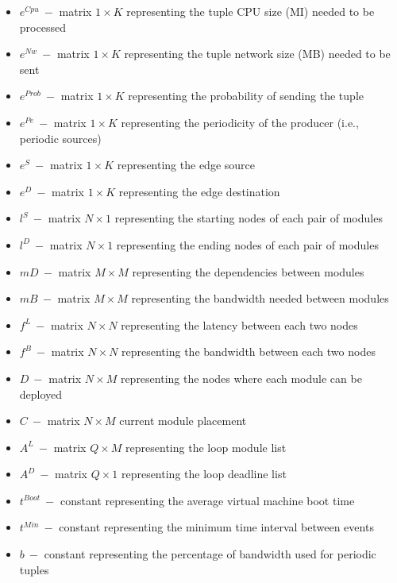 \documentclass{article}
\begin{document}
\begin{itemize}
	\item $e^{Cpu}~-$ matrix $1\times K$ representing the tuple CPU size (MI) needed to be processed
	\item $e^{Nw}~-$ matrix $1\times K$ representing the tuple network size (MB) needed to be sent
	\item $e^{Prob}~-$ matrix $1\times K$ representing the probability of sending the tuple
	\item $e^{Pe}~-$ matrix $1\times K$ representing the periodicity of the producer (i.e., periodic sources)
	\item $e^{S}~-$ matrix $1\times K$ representing the edge source
	\item $e^{D}~-$ matrix $1\times K$ representing the edge destination\\
	
	\item $l^S~-$ matrix $N\times 1$ representing the starting nodes of each pair of modules
	\item $l^D~-$ matrix $N\times 1$ representing the ending nodes of each pair of modules\\
	
	\item $mD~-$ matrix $M\times M$ representing the dependencies between modules
	\item $mB~-$ matrix $M\times M$ representing the bandwidth needed between modules\\
	
	\item $f^L~-$ matrix $N\times N$ representing the latency between each two nodes
	\item $f^B~-$ matrix $N\times N$ representing the bandwidth between each two nodes
	
	\item $D~-$ matrix $N\times M$ representing the nodes where each module can be deployed
	\item $C~-$ matrix $N\times M$ current module placement\\
	
	\item $A^L~-$ matrix $Q\times M$ representing the loop module list
	\item $A^D~-$ matrix $Q\times 1$ representing the loop deadline list\\
	
	\item $t^{Boot}~-$ constant representing the average virtual machine boot time
	\item $t^{Min}~-$ constant representing the minimum time interval between events
	\item $b~-$ constant representing the percentage of bandwidth used for periodic tuples
\end{itemize}
\end{document}
